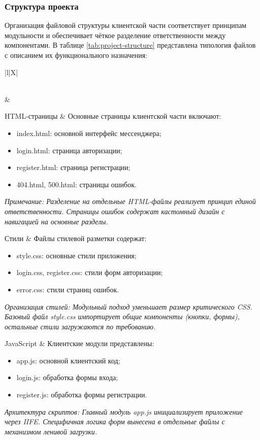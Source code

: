 \subsubsection{Структура проекта}  
Организация файловой структуры клиентской части соответствует принципам модульности и обеспечивает чёткое разделение ответственности между компонентами. В таблице \ref{tab:project-structure} представлена типология файлов с описанием их функционального назначения:
\begin{xltabular}{\textwidth}{|l|X|}  
	\caption{Файловая структура клиентской части}\label{tab:project-structure} \\ \hline  
	 &  \\ \hline   
	\endfirsthead  
	\finishhead  
	
	HTML-страницы &  
	Основные страницы клиентской части включают:  
	\begin{itemize}[leftmargin=*,nosep]  
		\item index.html: основной интерфейс мессенджера;  
		\item login.html: страница авторизации;  
		\item register.html: страница регистрации;  
		\item 404.html, 500.html: страницы ошибок.  
	\end{itemize} 
	
	\smallskip
	\textit{Примечание: Разделение на отдельные HTML-файлы реализует принцип единой ответственности. Страницы ошибок содержат кастомный дизайн с навигацией на основные разделы.} \\ \hline  
	
	Стили &  
	Файлы стилевой разметки содержат:  
	\begin{itemize}[leftmargin=*,nosep]  
		\item style.css: основные стили приложения;  
		\item login.css, register.css: стили форм авторизации;  
		\item error.css: стили страниц ошибок.  
	\end{itemize} 
	
	\smallskip
	\textit{Организация стилей: Модульный подход уменьшает размер критического CSS. Базовый файл style.css импортирует общие компоненты (кнопки, формы), остальные стили загружаются по требованию.} \\ \hline  
	
	JavaScript &  
	Клиентские модули представлены:  
	\begin{itemize}[leftmargin=*,nosep]  
		\item app.js: основной клиентский код;  
		\item login.js: обработка формы входа;  
		\item register.js: обработка формы регистрации.  
	\end{itemize} 
	
	\smallskip
	\textit{Архитектура скриптов: Главный модуль app.js инициализирует приложение через IIFE. Специфичная логика форм вынесена в отдельные файлы с механизмом ленивой загрузки.} \\ \hline  
\end{xltabular}

